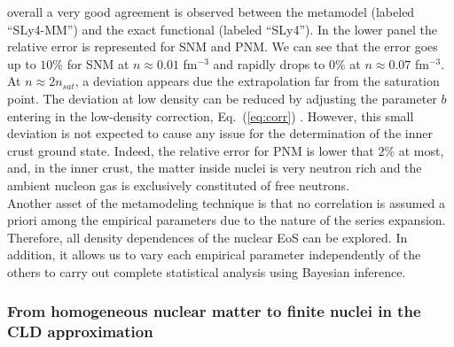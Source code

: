overall a very good agreement is observed between the metamodel (labeled
``SLy4-MM'') and the exact functional (labeled ``SLy4''). In the lower panel 
the relative error is represented for
SNM and PNM. We can see that the error goes up to $10\%$ for SNM at $n \approx
0.01$ fm$^{-3}$ and rapidly drops to $0\%$ at $n \approx 0.07$
fm$^{-3}$. At $n \approx 2n_{sat}$, a deviation appears due the extrapolation far
from the saturation point. The deviation at low density can be reduced by 
adjusting the parameter $b$ entering in the low-density correction,
Eq.~(\ref{eq:corr}) \cite{Antic2019}. However,
this small deviation is not expected to cause any issue for the determination
of the inner crust ground state. Indeed, the relative error for PNM is lower 
that $2\%$ at most, and, in the inner crust, the matter inside nuclei is very 
neutron rich and the ambient nucleon gas is exclusively constituted of free
neutrons. \\
Another asset of the metamodeling technique is that no correlation is assumed
a priori among the empirical parameters due to the nature of the
series expansion. Therefore, all density dependences of the
nuclear EoS can be explored. In addition, it allows us to vary each empirical 
parameter independently of the others to carry out complete statistical 
analysis using Bayesian inference. 

\subsubsection{From homogeneous nuclear matter to finite nuclei in the CLD 
approximation}


